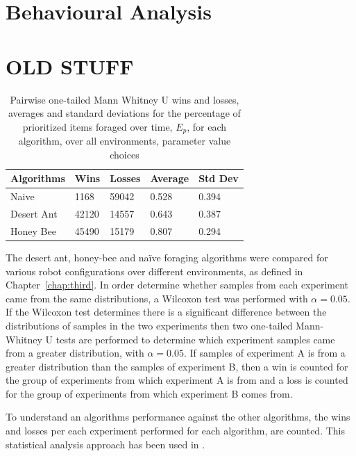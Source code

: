 \section{Behavioural Analysis}
\label{results:behaviouralanalysis}



\section{OLD STUFF}

\begin{table}
\centering
    \caption{Pairwise one-tailed Mann Whitney U wins and losses, averages and standard deviations for the percentage of prioritized items foraged over time, $E_p$, for each algorithm, over all environments, parameter value choices }
        \label{summarytable}
    \begin{tabular}{l|llll}
    \hline \hline
    Algorithms & Wins & Losses & Average & Std Dev \\ \hline
    Naive      & 1168    & 59042 & 0.528   & 0.394  \\
    Desert Ant  & 42120 & 14557 & 0.643   & 0.387  \\
    Honey Bee   & 45490 & 15179 & 0.807   & 0.294  \\
    \hline
    \end{tabular}
\end{table}

The desert ant, honey-bee and na\"ive foraging algorithms were compared for various robot configurations over different environments, as defined in Chapter~\ref{chap:third}. In order determine whether samples from each experiment came from the same distributions, a Wilcoxon test was performed with $\alpha=0.05$. If the Wilcoxon test determines there is a significant difference between the distributions of samples in the two experiments then two one-tailed Mann-Whitney U tests are performed to determine which experiment samples came from a greater distribution, with $\alpha=0.05$. If samples of experiment A is from a greater distribution than the samples of experiment B, then a win is counted for the group of experiments from which experiment A is from and a loss is counted for the group of experiments from which experiment B comes from. 

To understand an algorithms performance against the other algorithms, the wins and losses per each experiment performed for each algorithm, are counted. This statistical analysis approach has been used in \cite{helbig2013performance}. 

